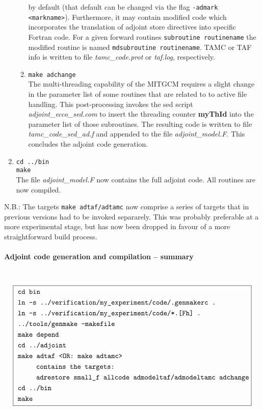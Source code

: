 \begin{enumerate}
\begin{enumerate}
by default (that default can be changed via the flag 
{\tt -admark <markname>}).
Furthermore, it may contain modified code which
incorporates the translation of adjoint store directives
into specific Fortran code.
For a given forward routines {\tt subroutine routinename}
the modified routine is named {\tt mdsubroutine routinename}.
TAMC or TAF info is written to file
{\it tamc\_code.prot} or {\it taf.log}, respectively.
%
\item
{\tt make adchange} \\
The multi-threading capability of the MITGCM requires a slight
change in the parameter list of some routines that are related to
to active file handling.
This post-processing invokes the sed script {\it adjoint\_ecco\_sed.com}
to insert the threading counter {\bf myThId} into the parameter list
of those subroutines.
The resulting code is written to file {\it tamc\_code\_sed\_ad.f}
and appended to the file {\it adjoint\_model.F}.
This concludes the adjoint code generation.
%
\end{enumerate}
%
\item
{\tt cd ../bin} \\
{\tt make} \\
The file {\it adjoint\_model.F} now contains the full adjoint code.
All routines are now compiled.
%
\end{enumerate}

N.B.: The targets {\tt make adtaf/adtamc} now comprise a
series of targets that in previous versions had to be
invoked separarely. This was probably preferable at a more
experimental stage, but has now been dropped in favour of
a more straightforward build process.


\paragraph{Adjoint code generation and compilation -- summary}
~ \\

{\small
\[
\boxed{
\begin{split}
 ~ & \mbox{\tt cd bin} \\
 ~ & \mbox{\tt ln -s ../verification/my\_experiment/code/.genmakerc .} \\
 ~ & \mbox{\tt ln -s ../verification/my\_experiment/code/*.[Fh] .} \\
 ~ & \mbox{\tt ../tools/genmake -makefile} \\
 ~ & \mbox{\tt make depend} \\
 ~ & \mbox{\tt cd ../adjoint} \\
 ~ & \mbox{\tt make adtaf <OR: make adtamc>} \\
 ~ & \hspace*{6ex} \mbox{\tt                 contains the targets:} \\
 ~ & \hspace*{6ex} \mbox{\tt                 adrestore small\_f allcode admodeltaf/admodeltamc adchange} \\
 ~ & \mbox{\tt cd ../bin} \\
 ~ & \mbox{\tt make} \\
\end{split}
}
\]
}
